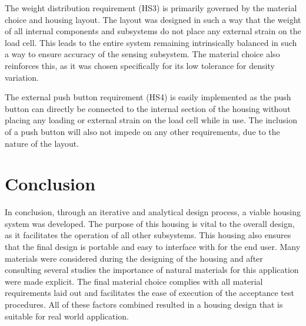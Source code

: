 \documentclass[class=report,11pt,crop=false]{standalone}
\begin{document}
The weight distribution requirement (HS3) is primarily governed by the material choice and housing layout. The layout was designed in such a way that the weight of all internal components and subsystems do not place any external strain on the load cell. This leads to the entire system remaining intrinsically balanced in such a way to ensure accuracy of the sensing subsystem. The material choice also reinforces this, as it was chosen specifically for its low tolerance for density variation.

The external push button requirement (HS4) is easily implemented as the push button can directly be connected to the internal section of the housing without placing any loading or external strain on the load cell while in use. The inclusion of a push button will also not impede on any other requirements, due to the nature of the layout. 

\section{Conclusion}
In conclusion, through an iterative and analytical design process, a viable housing system was developed. The purpose of this housing is vital to the overall design, as it facilitates the operation of all other subsystems. This housing also ensures that the final design is portable and easy to interface with for the end user. Many materials were considered during the designing of the housing and after consulting several studies the importance of natural materials for this application were made explicit. The final material choice complies with all material requirements laid out and facilitates the ease of execution of the acceptance test procedures. All of these factors combined resulted in a housing design that is suitable for real world application. 
	\ifstandalone
	
	\printnoidxglossary[type=\acronymtype,nonumberlist]
	\fi
	
\end{document}
